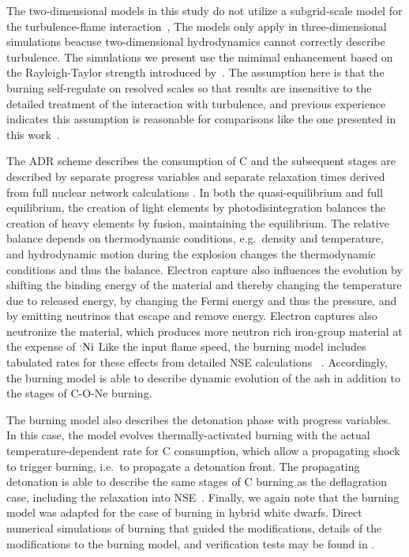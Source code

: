 \documentclass[iop,apj]{emulateapj}
\newcommand{\Ni}[1]{\ensuremath{{}^{#1}{\rm Ni}}}
\begin{document}
The two-dimensional models in this study do not utilize a subgrid-scale
model for the turbulence-flame 
interaction~\citep[See][for examples]{Schmetal06a,Schmetal06b,jacketal2014},
The models only apply in three-dimensional
simulations beacuse two-dimensional hydrodynamics cannot
correctly describe turbulence. The simulations we present
use the mimimal enhancement based on the Rayleigh-Taylor
strength introduced by~\citet{townsley.calder.ea:flame}. The
assumption here is that the burning self-regulate on resolved 
scales so that results are insensitive to the detailed treatment 
of the interaction with turbulence, and previous experience
indicates this assumption is reasonable for comparisons
like the one presented in this work~\citet{townsley.calder.ea:flame,
willcoxetal2016}. 

The ADR scheme describes the consumption of C and the subsequent stages
are described by separate progress variables and
separate relaxation times derived from full nuclear network calculations
\cite{Caldetal07,townetal2016}. In both the quasi-equilibrium and full equilibrium, 
the creation of light elements by photodisintegration balances the creation of heavy 
elements by fusion, maintaining the equilibrium. The relative balance depends on
thermodynamic conditions, e.g.\ density and temperature, and hydrodynamic motion
during the explosion changes the thermodynamic conditions and thus the
balance. Electron capture also influences the evolution by shifting the binding 
energy of the material and thereby changing the temperature due to released energy, 
by changing the Fermi energy and thus the pressure, and by emitting neutrinos that 
escape and remove energy. Electron captures also neutronize the material, which 
produces more neutron rich iron-group material at the expense of \Ni. Like the 
input flame speed, the burning model includes tabulated rates for these effects 
from detailed NSE calculations ~\cite{SeitTownetal09}. Accordingly, the burning
model is able to describe dynamic evolution of the ash in addition to the 
stages of C-O-Ne burning.

The burning model also describes the detonation phase with progress variables.  
In this case, the model evolves thermally-activated burning with the actual
temperature-dependent rate for C consumption, which allow a propagating shock to
trigger burning, i.e.\ to propagate a detonation front. The propagating detonation 
is able to describe the same stages of C burning as the deflagration case, including 
the relaxation into NSE~\cite[and references therein]{townetal2016}. Finally,
we again note that the burning model was adapted for the case of burning in
hybrid white dwarfs. Direct numerical simulations of burning that guided 
the modifications, details of the modifications to the burning model, and
verification tests may be found in \citet{willcoxetal2016}.
\end{document}
